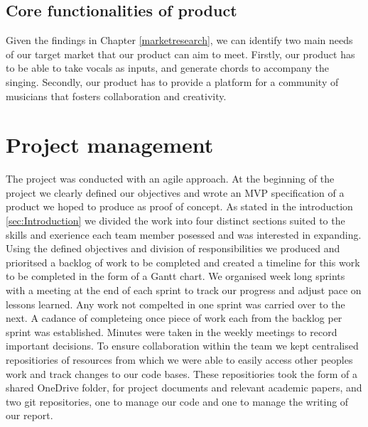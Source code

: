 \subsection{Core functionalities of product}
\label{coreproduct}


Given the findings in Chapter \ref{marketresearch}, we can identify two main needs of our target market that our product can aim to meet. Firstly, our product has to be able to take vocals as inputs, and generate chords to accompany the singing. Secondly, our product has to provide a platform for a community of musicians that fosters collaboration and creativity.

\section{Project management}

The project was conducted with an agile approach. 
At the beginning of the project we clearly defined our objectives and wrote an MVP specification of a product we hoped to produce as proof of concept.
As stated in the introduction \ref{sec:Introduction} we divided the work into four distinct sections suited to the skills and exerience each team member posessed and was interested in expanding.
Using the defined objectives and division of responsibilities we produced and prioritsed a backlog of work to be completed and created a timeline for this work to be completed in the form of a Gantt chart.
We organised week long sprints with a meeting at the end of each sprint to track our progress and adjust pace on lessons learned. 
Any work not compelted in one sprint was carried over to the next.
A cadance of completeing once piece of work each from the backlog per sprint was established.
Minutes were taken in the weekly meetings to record important decisions.
To ensure collaboration within the team we kept centralised repositiories of resources from which we were able to easily access other peoples work and track changes to our code bases.
These repositiories took the form of a shared OneDrive folder, for project documents and relevant academic papers, and two git repositories, one to manage our code and one to manage the writing of our report.


